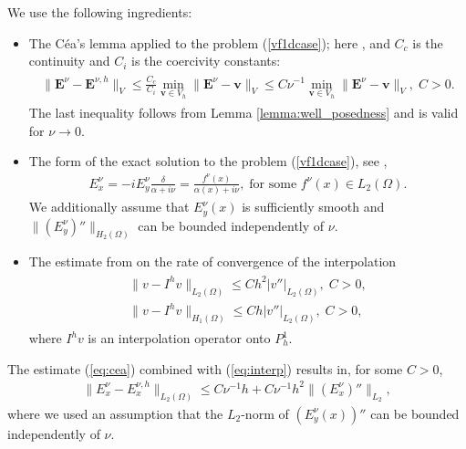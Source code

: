 We use the following ingredients:
\begin{itemize}
 \item The C\'ea's lemma applied to the problem (\ref{vf1dcase}); here , and $C_c$ is the continuity and $C_i$ is the coercivity constants:
\begin{align}
\label{eq:cea}
\begin{split}
 \|\mathbf{E}^{\nu}-\mathbf{E}^{\nu,h}\|_{V}\leq \frac{C_c}{C_i}\min_{\mathbf{v}\in V_h}\|\mathbf{E}^{\nu}-\mathbf{v}\|_{V}
 \leq C\nu^{-1}\min_{\mathbf{v}\in V_h}\|\mathbf{E}^{\nu}-\mathbf{v}\|_{V},\; C>0.
 \end{split}
\end{align}
The last inequality follows from Lemma \ref{lemma:well_posedness} and is valid for $\nu\rightarrow 0$.   
\item The form of the exact solution to the problem (\ref{vf1dcase}), see \cite{Despres_2014},
\begin{align}
\label{eq:exact}
 E_x^{\nu}=-iE_{y}^{\nu}\frac{\delta}{\alpha+i\nu}=\frac{f^{\nu}(x)}{\alpha(x)+i\nu}, \; \text{for some }f^{\nu}(x)\in L_{2}(\Omega).
\end{align}
We additionally assume that $E_y^{\nu}(x)$ is sufficiently smooth and $\|(E_y^{\nu})''\|_{H_{2}(\Omega)}$
can be bounded independently of $\nu$. 
\item The estimate from \cite[Chapter 0]{brenner} on the rate of convergence of the interpolation 
\begin{align}
\label{eq:interp}
\begin{split}
 \|v-I^{h}v\|_{L_{2}(\Omega)}\leq Ch^2\left|v''\right|_{L_{2}(\Omega)},\; C>0,\\
 \|v-I^{h}v\|_{H_{1}(\Omega)}\leq Ch|v''|_{L_{2}(\Omega)},\; C>0, 
 \end{split}
\end{align}
where $I^{h}v$ is an interpolation operator onto $P_{h}^{1}$. 
\end{itemize}
The estimate (\ref{eq:cea}) combined with (\ref{eq:interp}) results in, for some $C>0$,
\begin{align}
  \label{eq:final_est}
  \|E^{\nu}_{x}-E^{\nu,h}_{x}\|_{L_{2}(\Omega)}%
  \leq C\nu^{-1}h+C\nu^{-1}h^2\|\left(E_x^{\nu}\right)''\|_{L_{2}},
\end{align}
where we used an assumption that the $L_2$-norm of $\left(E_y^{\nu}(x)\right)''$ can be bounded independently of $\nu$.


